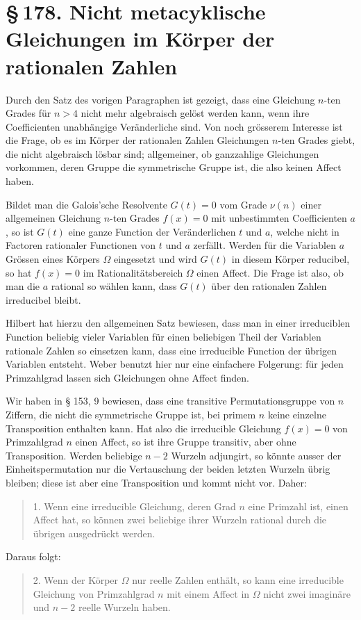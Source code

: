 \documentclass[11pt]{article}
\providecommand{\sect}[2]{\section*{\S\,#1. #2}}
\begin{document}
\sect{178}{Nicht metacyklische Gleichungen im Körper der rationalen Zahlen}

Durch den Satz des vorigen Paragraphen ist gezeigt, dass eine Gleichung $n$-ten Grades für $n>4$ nicht mehr algebraisch gelöst werden kann, wenn ihre Coefficienten unabhängige Veränderliche sind. Von noch grösserem Interesse ist die Frage, ob es im Körper der rationalen Zahlen Gleichungen $n$-ten Grades giebt, die nicht algebraisch lösbar sind; allgemeiner, ob ganzzahlige Gleichungen vorkommen, deren Gruppe die symmetrische Gruppe ist, die also keinen Affect haben.

Bildet man die Galois'sche Resolvente $G(t)=0$ vom Grade $\nu(n)$ einer allgemeinen Gleichung $n$-ten Grades $f(x)=0$ mit unbestimmten Coefficienten $a$, so ist $G(t)$ eine ganze Function der Veränderlichen $t$ und $a$, welche nicht in Factoren rationaler Functionen von $t$ und $a$ zerfällt. Werden für die Variablen $a$ Grössen eines Körpers $\Omega$ eingesetzt und wird $G(t)$ in diesem Körper reducibel, so hat $f(x)=0$ im Rationalitätsbereich $\Omega$ einen Affect. Die Frage ist also, ob man die $a$ rational so wählen kann, dass $G(t)$ über den rationalen Zahlen irreducibel bleibt.

Hilbert hat hierzu den allgemeinen Satz bewiesen, dass man in einer irreduciblen Function beliebig vieler Variablen für einen beliebigen Theil der Variablen rationale Zahlen so einsetzen kann, dass eine irreducible Function der übrigen Variablen entsteht. Weber benutzt hier nur eine einfachere Folgerung: für jeden Primzahlgrad lassen sich Gleichungen ohne Affect finden.

Wir haben in § 153, 9 bewiesen, dass eine transitive Permutationsgruppe von $n$ Ziffern, die nicht die symmetrische Gruppe ist, bei primem $n$ keine einzelne Transposition enthalten kann. Hat also die irreducible Gleichung $f(x)=0$ von Primzahlgrad $n$ einen Affect, so ist ihre Gruppe transitiv, aber ohne Transposition. Werden beliebige $n-2$ Wurzeln adjungirt, so könnte ausser der Einheitspermutation nur die Vertauschung der beiden letzten Wurzeln übrig bleiben; diese ist aber eine Transposition und kommt nicht vor. Daher:

\begin{quote}
1. Wenn eine irreducible Gleichung, deren Grad $n$ eine Primzahl ist, einen Affect hat, so können zwei beliebige ihrer Wurzeln rational durch die übrigen ausgedrückt werden.
\end{quote}

Daraus folgt:
\begin{quote}
2. Wenn der Körper $\Omega$ nur reelle Zahlen enthält, so kann eine irreducible Gleichung von Primzahlgrad $n$ mit einem Affect in $\Omega$ nicht zwei imaginäre und $n-2$ reelle Wurzeln haben.
\end{quote}
\end{document}

